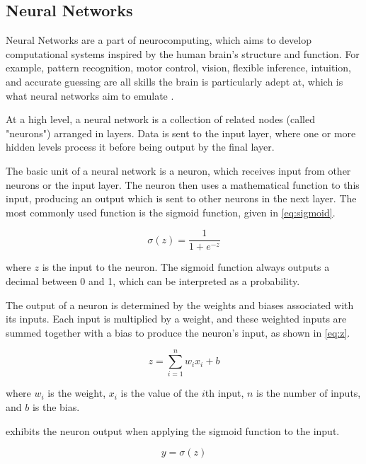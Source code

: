 \subsection{Neural Networks}\label{neuralnet}
Neural Networks are a part of neurocomputing, which aims to develop computational systems inspired by the human brain's structure and function. For example, pattern recognition, motor control, vision, flexible inference, intuition, and accurate guessing are all skills the brain is particularly adept at, which is what neural networks aim to emulate \autocite{anderson1995introduction}. 

At a high level, a neural network is a collection of related nodes (called "neurons") arranged in layers. Data is sent to the input layer, where one or more hidden levels process it before being output by the final layer.

The basic unit of a neural network is a neuron, which receives input from other neurons or the input layer. The neuron then uses a mathematical function to this input, producing an output which is sent to other neurons in the next layer. The most commonly used function is the sigmoid function, given in \cref{eq:sigmoid}. 

\begin{equation}
    \sigma(z) = \frac{1}{1+e^{-z}}
    \label{eq:sigmoid}
\end{equation}

where $z$ is the input to the neuron. The sigmoid function always outputs a decimal between 0 and 1, which can be interpreted as a probability.

The output of a neuron is determined by the weights and biases associated with its inputs. Each input is multiplied by a weight, and these weighted inputs are summed together with a bias to produce the neuron's input, as shown in \cref{eq:z}. 

\begin{equation}
    z = \sum_{i=1}^n w_i x_i + b
    \label{eq:z}
\end{equation}

where $w_i$ is the weight, $x_i$ is the value of the $i$th input, $n$ is the number of inputs, and $b$ is the bias. 

 exhibits the neuron output when applying the sigmoid function to the input.

\begin{equation}
    y = \sigma(z)
    \label{eq:y}
\end{equation}

